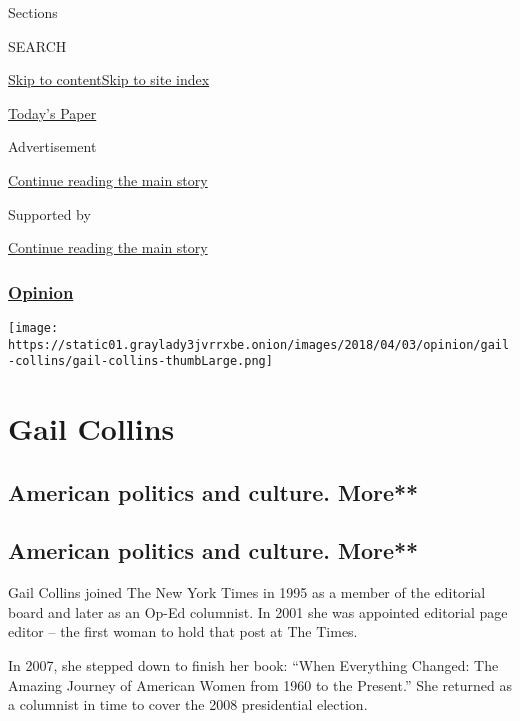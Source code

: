 Sections

SEARCH

\protect\hyperlink{site-content}{Skip to
content}\protect\hyperlink{site-index}{Skip to site index}

\href{https://myaccount.nytimes3xbfgragh.onion/auth/login?response_type=cookie\&client_id=vi}{}

\href{https://www.nytimes3xbfgragh.onion/section/todayspaper}{Today's
Paper}

Advertisement

\protect\hyperlink{after-top}{Continue reading the main story}

Supported by

\protect\hyperlink{after-sponsor}{Continue reading the main story}

\hypertarget{opinion}{%
\subsubsection{\texorpdfstring{\href{/section/opinion}{Opinion}}{Opinion}}\label{opinion}}

\texttt{[image: https://static01.graylady3jvrrxbe.onion/images/2018/04/03/opinion/gail-collins/gail-collins-thumbLarge.png]}

\hypertarget{gail-collins}{%
\section{Gail Collins}\label{gail-collins}}

\hypertarget{american-politics-and-culture-more}{%
\subsection{American politics and culture.
More**}\label{american-politics-and-culture-more}}

\hypertarget{american-politics-and-culture-more-1}{%
\subsection{American politics and culture.
More**}\label{american-politics-and-culture-more-1}}

Gail Collins joined The New York Times in 1995 as a member of the
editorial board and later as an Op-Ed columnist. In 2001 she was
appointed editorial page editor -- the first woman to hold that post at
The Times.

In 2007, she stepped down to finish her book: ``When Everything Changed:
The Amazing Journey of American Women from 1960 to the Present.'' She
returned as a columnist in time to cover the 2008 presidential election.

